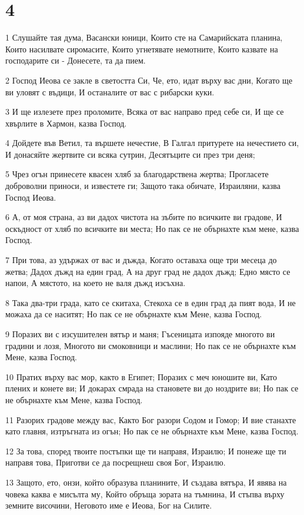 \chapter{4}

\par 1 Слушайте тая дума, Васански юници,  Които сте на Самарийската планина, Които насилвате сиромасите, Които угнетявате немотните, Които казвате на господарите си - Донесете, та да пием.
\par 2 Господ Иеова се закле в светостта Си, Че, ето, идат върху вас дни, Когато ще ви уловят с въдици, И останалите от вас с рибарски куки.
\par 3 И ще излезете през проломите, Всяка от вас направо пред себе си, И ще се хвърлите в Хармон, казва Господ.
\par 4 Дойдете във Ветил, та вършете нечестие, В Галгал притурете на нечестието си, И донасяйте жертвите си всяка сутрин, Десятъците си през три деня;
\par 5 Чрез огън принесете квасен хляб за благодарствена жертва; Прогласете доброволни приноси, и известете ги; Защото така обичате, Израиляни, казва Господ Иеова.
\par 6 А, от моя страна, аз ви дадох чистота на зъбите по всичките ви градове, И оскъдност от хляб по всичките ви места; Но пак се не обърнахте към мене, казва Господ.
\par 7 При това, аз удържах от вас и дъжда, Когато оставаха още три месеца до жетва; Дадох дъжд на един град, А на друг град не дадох дъжд; Едно място се напои, А мястото, на което не валя дъжд изсъхна.
\par 8 Така два-три града, като се  скитаха, Стекоха се в един град да пият вода, И не можаха да се наситят; Но пак се не обърнахте към Мене, казва Господ.
\par 9 Поразих ви с изсушителен вятър и маня; Гъсеницата изпояде многото ви градини и лозя, Многото ви смоковници и маслини; Но пак се не обърнахте към Мене, казва Господ.
\par 10 Пратих върху вас мор, както в Египет; Поразих с меч юношите ви, Като плених и конете ви; И докарах смрада на становете ви до ноздрите ви; Но пак се не обърнахте към Мене, казва Господ.
\par 11 Разорих градове между вас, Както Бог разори Содом и Гомор; И вие станахте като главня, изтръгната из огън; Но пак се не обърнахте към Мене, казва Господ.
\par 12 За това, според твоите постъпки ще ти направя, Израилю; И понеже ще ти направя това, Приготви се да посрещнеш своя Бог, Израилю.
\par 13 Защото, ето, онзи, който образува планините, И създава вятъра, И явява на човека каква е мисълта му, Който обръща зората на тъмнина, И стъпва върху земните височини, Неговото име е Иеова, Бог на Силите.

